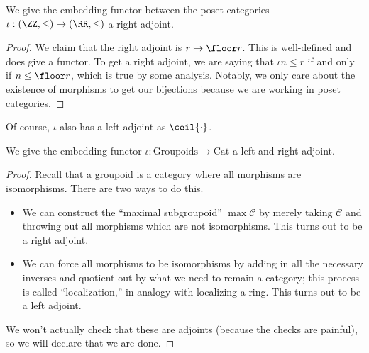 \documentclass[../notes.tex]{subfiles}
\begin{document}
\begin{exe}
	We give the embedding functor between the poset categories $\iota:(\ZZ,\le)\to(\RR,\le)$ a right adjoint.
\end{exe}
\begin{proof}
	We claim that the right adjoint is $r\mapsto\floor r$. This is well-defined and does give a functor. To get a right adjoint, we are saying that $\iota n\le r$ if and only if $n\le\floor r$, which is true by some analysis. Notably, we only care about the existence of morphisms to get our bijections because we are working in poset categories.
\end{proof}
\begin{remark}
	Of course, $\iota$ also has a left adjoint as $\ceil{\cdot}$.
\end{remark}
\begin{exe}
	We give the embedding functor $\iota:\mathrm{Groupoids}\to\mathrm{Cat}$ a left and right adjoint.
\end{exe}
\begin{proof}
	Recall that a groupoid is a category where all morphisms are isomorphisms. There are two ways to do this.
	\begin{itemize}
		\item We can construct the ``maximal subgroupoid'' $\max\mathcal C$ by merely taking $\mathcal C$ and throwing out all morphisms which are not isomorphisms. This turns out to be a right adjoint.
		\item We can force all morphisms to be isomorphisms by adding in all the necessary inverses and quotient out by what we need to remain a category; this process is called ``localization,'' in analogy with localizing a ring. This turns out to be a left adjoint.
	\end{itemize}
	We won't actually check that these are adjoints (because the checks are painful), so we will declare that we are done.
\end{proof}
\end{document}

